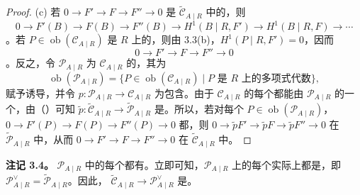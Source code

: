 \begin{proof}
(c) 若 $0\to F'\to F\to F''\to0$ 是 $\widetilde{\mathcal C}_{A\mid R}$ 中的，则
\[0\to F'(B)\to F(B)\to F''(B)\to H^1(B\mid R,F')\to H^1(B\mid R,F)\to\cdots\]
。若 $P\in\operatorname{ob}(\mathcal C_{A\mid R})$ 是 $R$ 上的，则由 3.3(b)，$H^1(P\mid R,F')=0$，因而
\[0\to F'\to F\to F''\to0\]
。反之，令 $\mathcal P_{A\mid R}$ 为 $\mathcal C_{A\mid R}$ 的，其为
\[\operatorname{ob}(\mathcal P_{A\mid R})=\{P\in\operatorname{ob}(\mathcal C_{A\mid R})\mid P\text{ 是 }R\text{ 上的多项式代数}\},\]
赋予诱导，并令 $p:\mathcal P_{A\mid R}\to\mathcal C_{A\mid R}$ 为包含。由于 $\mathcal C_{A\mid R}$ 的每个都能由 $\mathcal P_{A\mid R}$ 的一个，由（）可知 $\widetilde p:\widetilde{\mathcal C}_{A\mid R}\to\widetilde{\mathcal P}_{A\mid R}$ 是。所以，若对每个 $P\in\operatorname{ob}(\mathcal P_{A\mid R})$，$0\to F'(P)\to F(P)\to F''(P)\to0$ 都，则 $0\to\widetilde pF'\to\widetilde pF\to\widetilde pF''\to0$ 在 $\widetilde{\mathcal P}_{A\mid R}$ 中，从而 $0\to F'\to F\to F''\to0$ 在 $\widetilde{\mathcal C}_{A\mid R}$ 中。
\end{proof}

\textbf{注记 3.4。} $\mathcal P_{A\mid R}$ 中的每个都有。立即可知，$\mathcal P_{A\mid R}$ 上的每个实际上都是，即 $\mathcal P_{A\mid R}^{\vee}=\widetilde{\mathcal P}_{A\mid R}$。因此， $\widetilde{\mathcal C}_{A\mid R}\to\mathcal P_{A\mid R}^{\vee}$ 是。

